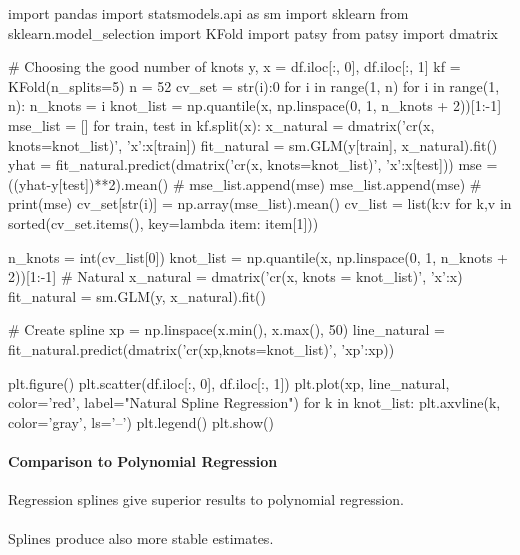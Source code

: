 \begin{python}
import pandas 
import statsmodels.api as sm
import sklearn
from sklearn.model_selection import KFold
import patsy
from patsy import dmatrix

# Choosing the good number of knots
y, x = df.iloc[:, 0], df.iloc[:, 1]
kf = KFold(n_splits=5)
n = 52
cv_set = {str(i):0 for i in range(1, n)}
for i in range(1, n):
    n_knots = i
    knot_list = np.quantile(x, np.linspace(0, 1, n_knots + 2))[1:-1]
    mse_list = []
    for train, test in kf.split(x):
        x_natural = dmatrix('cr(x, knots=knot_list)', {'x':x[train]})
        fit_natural = sm.GLM(y[train], x_natural).fit()
        yhat = fit_natural.predict(dmatrix('cr(x, knots=knot_list)', {'x':x[test]}))
        mse = ((yhat-y[test])**2).mean()
        # mse_list.append(mse)
        mse_list.append(mse)
        # print(mse)
    cv_set[str(i)] = np.array(mse_list).mean()
cv_list = list({k:v for k,v in sorted(cv_set.items(), key=lambda item: item[1])})


n_knots = int(cv_list[0])
knot_list = np.quantile(x, np.linspace(0, 1, n_knots + 2))[1:-1]
# Natural
x_natural = dmatrix('cr(x, knots = knot_list)', {'x':x})
fit_natural = sm.GLM(y, x_natural).fit()

# Create spline
xp = np.linspace(x.min(), x.max(), 50)
line_natural = fit_natural.predict(dmatrix('cr(xp,knots=knot_list)',
                                           {'xp':xp}))

plt.figure()
plt.scatter(df.iloc[:, 0], df.iloc[:, 1])
plt.plot(xp, line_natural, color='red', label="Natural Spline Regression")
for k in knot_list:
    plt.axvline(k, color='gray', ls='--')
plt.legend()
plt.show()
\end{python}
\paragraph{Comparison to Polynomial Regression}
Regression splines give superior results to polynomial regression.\\
\\
Splines produce also more stable estimates.
